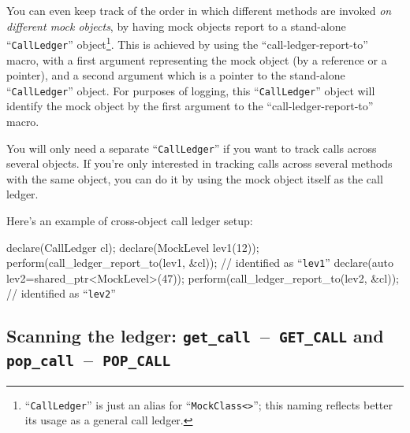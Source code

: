 \documentclass[twoside, a4paper, article]{memoir}
\newcommand*\testudocolor{\color{red!80!blue}}
\newcommand*\testudo[1]{\texttt{\testudocolor{}#1}}
\newcommand*\testudopair[2]{\testudo{#1}~--~\testudo{#2}}
\begin{document}
You can even keep track of the order in which different methods are invoked
\emph{on different mock objects}, by having mock objects report to a
stand-alone ``\texttt{CallLedger}''
object\footnote{``\texttt{CallLedger}'' is just an alias for
  ``\texttt{MockClass<>}''; this naming reflects better its usage as a
  general call ledger.}.
This is achieved by using the ``call-ledger-report-to'' macro, with a first
argument representing the mock object (by a reference or a pointer), and a
second argument which is a pointer to the stand-alone ``\texttt{CallLedger}''
object.  For purposes of logging, this ``\texttt{CallLedger}'' object will
identify the mock object by the first argument to the ``call-ledger-report-to''
macro.

You will only need a separate ``\texttt{CallLedger}'' if you want to
track calls across several objects.  If you're only interested in tracking
calls across several methods with the same object, you can do it by using the
mock object itself as the call ledger.

Here's an example of cross-object call ledger setup:
\begin{cpplisting}
declare(CallLedger cl);
declare(MockLevel lev1(12));
perform(call_ledger_report_to(lev1, &cl)); // identified as ``\texttt{lev1}''
declare(auto lev2=shared_ptr<MockLevel>(47));
perform(call_ledger_report_to(lev2, &cl)); // identified as ``\texttt{lev2}''
\end{cpplisting}

\subsection[Scanning the ledger]%
  {Scanning the ledger:
    \testudopair{get\_call}{GET\_CALL} and
    \testudopair{pop\_call}{POP\_CALL}}
\label{sec:scan-ledger}
\end{document}
